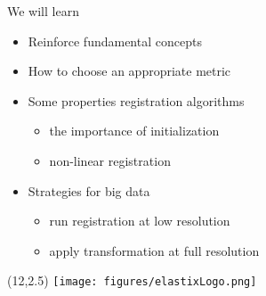\documentclass[aspectratio=169]{beamer}
\begin{document}
\begin{frame}{We will learn}

    \begin{itemize}
        \item Reinforce fundamental concepts
        \item How to choose an appropriate metric
        \item Some properties registration algorithms
        \begin{itemize}
            \item the importance of initialization
            \item non-linear registration
        \end{itemize}
        \item Strategies for big data
        \begin{itemize}
            \item run registration at low resolution
            \item apply transformation at full resolution
        \end{itemize}
    \end{itemize}

    \begin{textblock}{4}(12,2.5)
        \texttt{[image: figures/elastixLogo.png]}
    \end{textblock}

\end{frame}
\end{document}
